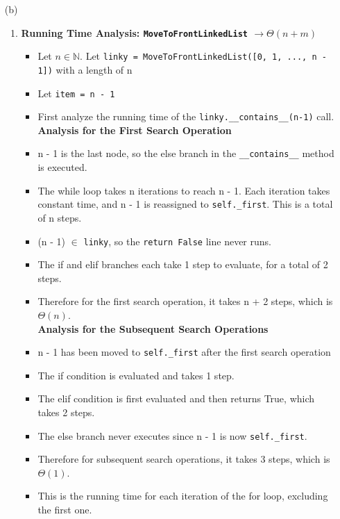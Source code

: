 \documentclass[fontsize=11pt]{article}
\begin{document}
\begin{enumerate}
\begin{enumerate}
    \item[(b)]
    \begin{enumerate}
        \item \textbf{Running Time Analysis: \texttt{MoveToFrontLinkedList} $\rightarrow\Theta(n + m)$}
        \begin{itemize}
            \item Let $n \in \mathbb{N}$. Let \texttt{linky = MoveToFrontLinkedList([0, 1, ..., n - 1])} with a length of n
            \item Let \texttt{item = n - 1}
            \item First analyze the running time of the \texttt{linky.\_\_contains\_\_(n-1)} call. \\
            
            \textbf{Analysis for the First Search Operation}
            \item n - 1 is the last node, so the else branch in the \texttt{\_\_contains\_\_} method is executed. 
            \item The while loop takes n iterations to reach n - 1. Each iteration takes constant time, and n - 1 is reassigned to \texttt{self.\_first}. This is a total of n steps.
            \item (n - 1) $\in $ \texttt{linky}, so the \texttt{return False} line never runs.
            \item The if and elif branches each take 1 step to evaluate, for a total of 2 steps.
            \item Therefore for the first search operation, it takes n + 2 steps, which is $\Theta(n)$.\\
            
            \textbf{Analysis for the Subsequent Search Operations}
            \item n - 1 has been moved to \texttt{self.\_first} after the first search operation
            \item The if condition is evaluated and takes 1 step.
            \item The elif condition is first evaluated and then returns True, which takes 2 steps.
            \item The else branch never executes since n - 1 is now \texttt{self.\_first}.
            \item Therefore for subsequent search operations, it takes 3 steps, which is $\Theta(1)$.
            \item This is the running time for each iteration of the for loop, excluding the first one.\\
            

\end{itemize}
\end{enumerate}
\end{enumerate}
\end{enumerate}
\end{document}

